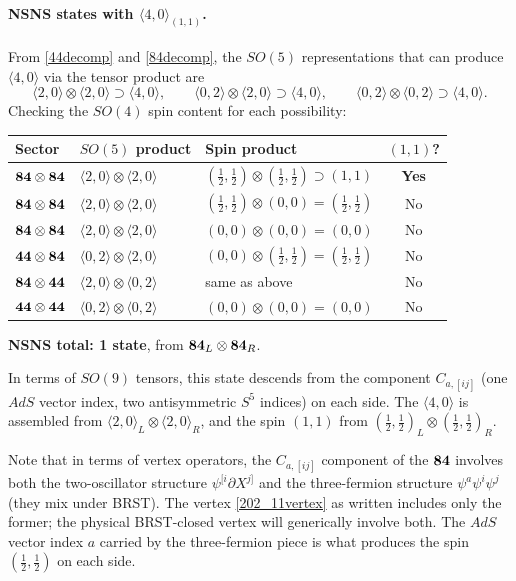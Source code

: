 \documentclass[12pt]{article}
\def\be{\begin{equation}}
\def\ee{\end{equation}}
\begin{document}
\paragraph{NSNS states with $\langle 4,0\rangle_{(1,1)}$.}
From \eqref{44decomp} and \eqref{84decomp}, the $SO(5)$ representations
that can produce $\langle 4,0\rangle$ via the tensor product are
\be
\langle 2,0\rangle\otimes\langle 2,0\rangle\supset\langle 4,0\rangle,
\qquad
\langle 0,2\rangle\otimes\langle 2,0\rangle\supset\langle 4,0\rangle,
\qquad
\langle 0,2\rangle\otimes\langle 0,2\rangle\supset\langle 4,0\rangle.
\ee
Checking the $SO(4)$ spin content for each possibility:

\smallskip
\begin{center}
\begin{tabular}{|l|l|l|c|}
\hline
Sector & $SO(5)$ product & Spin product & $(1,1)$? \\
\hline
${\bf 84}\otimes{\bf 84}$ & $\langle 2,0\rangle\otimes\langle 2,0\rangle$ &
$(\tfrac12,\tfrac12)\otimes(\tfrac12,\tfrac12)\supset(1,1)$ & \textbf{Yes} \\
${\bf 84}\otimes{\bf 84}$ & $\langle 2,0\rangle\otimes\langle 2,0\rangle$ &
$(\tfrac12,\tfrac12)\otimes(0,0)=(\tfrac12,\tfrac12)$ & No \\
${\bf 84}\otimes{\bf 84}$ & $\langle 2,0\rangle\otimes\langle 2,0\rangle$ &
$(0,0)\otimes(0,0)=(0,0)$ & No \\
${\bf 44}\otimes{\bf 84}$ & $\langle 0,2\rangle\otimes\langle 2,0\rangle$ &
$(0,0)\otimes(\tfrac12,\tfrac12)=(\tfrac12,\tfrac12)$ & No \\
${\bf 84}\otimes{\bf 44}$ & $\langle 2,0\rangle\otimes\langle 0,2\rangle$ &
same as above & No \\
${\bf 44}\otimes{\bf 44}$ & $\langle 0,2\rangle\otimes\langle 0,2\rangle$ &
$(0,0)\otimes(0,0)=(0,0)$ & No \\
\hline
\end{tabular}
\end{center}
\smallskip

\noindent\textbf{NSNS total: 1 state}, from ${\bf 84}_L\otimes{\bf 84}_R$.

In terms of $SO(9)$ tensors, this state descends from the component $C_{a,[ij]}$
(one $AdS$ vector index, two antisymmetric $S^5$ indices) on each side. The
$\langle 4,0\rangle$ is assembled from $\langle 2,0\rangle_L\otimes\langle 2,0\rangle_R$,
and the spin $(1,1)$ from $(\tfrac12,\tfrac12)_L\otimes(\tfrac12,\tfrac12)_R$.

Note that in terms of vertex operators, the $C_{a,[ij]}$ component of the ${\bf 84}$ involves
both the two-oscillator structure $\psi^{[i}\partial X^{j]}$ and the three-fermion structure
$\psi^a\psi^i\psi^j$ (they mix under BRST). The vertex \eqref{202_11vertex} as written
includes only the former; the physical BRST-closed vertex will generically involve both.
The $AdS$ vector index $a$ carried by the three-fermion piece is what produces the spin
$(\tfrac12,\tfrac12)$ on each side.
\end{document}
